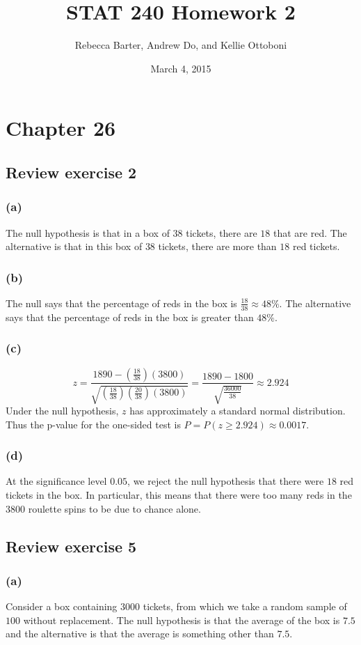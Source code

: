 \documentclass[11pt]{article}
\title{STAT 240 Homework 2}
\author{Rebecca Barter, Andrew Do, and Kellie Ottoboni}
\date{March 4, 2015} %
\begin{document}
\maketitle


\section{Chapter 26}
\subsection{Review exercise 2} %
\subsubsection{(a)}
The null hypothesis is that in a box of $38$ tickets, there are $18$ that are red.  The alternative is that in this box of $38$ tickets, there are more than $18$ red tickets.
\subsubsection{(b)}
The null says that the percentage of reds in the box is $\frac{18}{38}\approx 48\%$.  The alternative says that the percentage of reds in the box is greater than $48\%$.
\subsubsection{(c)}
$$z = \frac{1890 - (\frac{18}{38})(3800)}{\sqrt{ (\frac{18}{38}) (\frac{20}{38})(3800)}} = \frac{1890 - 1800}{\sqrt{\frac{36000}{38}}} \approx 2.924$$
Under the null hypothesis, $z$ has approximately a standard normal distribution.  Thus the p-value for the one-sided test is $P = P(z \geq 2.924) \approx 0.0017$.  
\subsubsection{(d)}
At the significance level $0.05$, we reject the null hypothesis that there were $18$ red tickets in the box.  In particular, this means that there were too many reds in the $3800$ roulette spins to be due to chance alone.

\subsection{Review exercise 5} %
\subsubsection{(a)}
Consider a box containing $3000$ tickets, from which we take a random sample of $100$ without replacement.  The null hypothesis is that the average of the box is $7.5$ and the alternative is that the average is something other than $7.5$.
\end{document}
